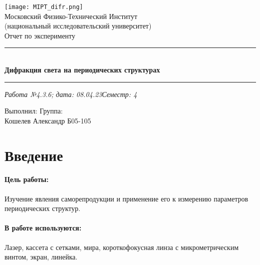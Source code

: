 \documentclass[12pt,a4paper]{article}
\begin{document}
	\begin{titlepage}
		\vspace*{\fill}
		
		\begin{center}
			\texttt{[image: MIPT\_difr.png]}
			\\[0.7cm]\Huge Московский Физико-Технический Институт\\(национальный исследовательский университет)
			\\[2cm]\LARGE Отчет по эксперименту
			\\[0.5cm]\noindent\rule{\textwidth}{1pt}
			\\\Huge\textbf{Дифракция света на периодических структурах}
			\\[-0.5cm]\noindent\rule{\textwidth}{1pt}
		\end{center}
		
		\begin{flushleft}
			\textit{Работа №4.3.6; дата: 08.04.23}\hfill\textit{Семестр: 4}
		\end{flushleft}
		
		\vspace*{\fill}
		
		\begin{flushleft}
			Выполнил: \hspace{\fill} Группа:
			\\Кошелев Александр \hspace{\fill} Б05-105
		\end{flushleft}
	\end{titlepage}
	
	\setcounter{page}{2}
	
	\section{Введение}
	
	\paragraph*{Цель работы:} \hfill
	
	Изучение явления саморепродукции и применение его к измерению параметров периодических структур.
	
	\paragraph*{В работе используются:} \hfill
	
	Лазер, кассета с сетками, мира, короткофокусная линза с микрометрическим винтом, экран, линейка.
	
\end{document}
